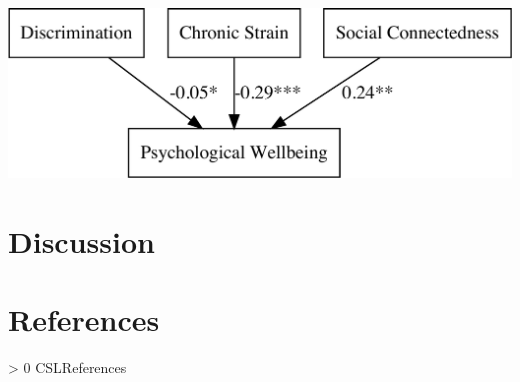 \documentclass[
  english,
  man,floatsintext]{apa6}
\newlength{\cslhangindent}
\newenvironment{CSLReferences}[3] %
 {%
  \setlength{\parindent}{0pt}
  \ifodd #1 \everypar{\setlength{\hangindent}{\cslhangindent}}\ignorespaces\fi
  \ifnum #2 > 0
  \setlength{\parskip}{#2\baselineskip}
  \fi
 }%
 {}
\begin{document}
\includegraphics{prep_script_files/figure-latex/lavaan plot-1.pdf}

\hypertarget{discussion}{%
\section{Discussion}\label{discussion}}

\newpage

\hypertarget{references}{%
\section{References}\label{references}}

\begingroup
\setlength{\parindent}{-0.5in}
\setlength{\leftskip}{0.5in}

\hypertarget{refs}{}
\begin{CSLReferences}{0}{0}
\end{CSLReferences}

\endgroup


\printbibliography
\end{document}
